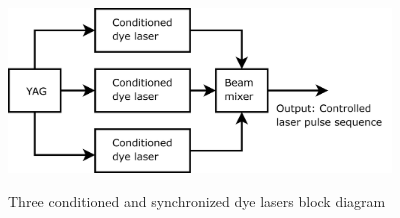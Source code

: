\begin{figure}
\center
\includegraphics[width=4.00in]
{block_three_dye/block_three_dye.png}\\
\caption{Three conditioned and synchronized dye lasers block diagram}
\label{block_three_dye}
\end{figure} 


